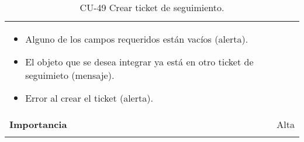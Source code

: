 \begin{longtable}[]{@{}ll@{}}
\begin{minipage}[t]{0.78\columnwidth}
\begin{itemize}
\tightlist
\item
  Alguno de los campos requeridos están vacíos (alerta).
\item
  El objeto que se desea integrar ya está en otro ticket de seguimieto
  (mensaje).
\item
  Error al crear el ticket (alerta).
\end{itemize}\strut
\end{minipage}\tabularnewline
\begin{minipage}[t]{0.16\columnwidth}\raggedright
\textbf{Importancia}\strut
\end{minipage} & \begin{minipage}[t]{0.78\columnwidth}\raggedright
Alta\strut
\end{minipage}\tabularnewline
\bottomrule
\caption{CU-49 Crear ticket de seguimiento.}
\end{longtable}

